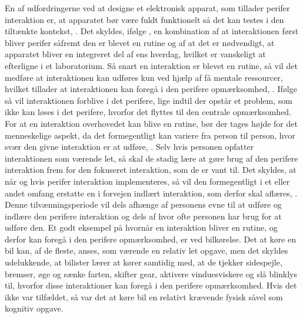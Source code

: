 En af udfordringerne ved at designe et elektronisk apparat, som tillader perifer interaktion er, at apparatet bør være fuldt funktionelt så det kan testes i den tiltænkte kontekst, \parencite[s. 21]{PDF:EvaluatingPI}. Det skyldes, ifølge \textcite[s. 22]{PDF:EvaluatingPI}, en kombination af at interaktionen først bliver perifer såfremt den er blevet en rutine og af at det er nødvendigt, at apparatet bliver en integreret del af ens hverdag, hvilket er vanskeligt at efterligne i et laboratorium. Så snart en interaktion er blevet en rutine, så vil det medføre at interaktionen kan udføres kun ved hjælp af få mentale ressourcer, hvilket tillader at interaktionen kan foregå i den perifere opmærksomhed, \parencite[s. 2]{PDF:FacilitatingPIDesignAndEvaluation}. Ifølge \textcite[s. 14]{PDF:PIUnseenKap2} så vil interaktionen forblive i det perifere, lige indtil der opstår et problem, som ikke kan løses i det perifere, hvorfor det flyttes til den centrale opmærksomhed. For at en interaktion overhovedet kan blive en rutine, bør der tages højde for det menneskelige aspekt, da det formegentligt kan variere fra person til person, hvor svær den givne interaktion er at udføre, \parencite[s. 248]{PDF:PICharacteristicsAndConsiderations}. Selv hvis personen opfatter interaktionen som værende let, så skal de stadig lære at gøre brug af den perifere interaktion frem for den fokuseret interaktion, som de er vant til. Det skyldes, at når og hvis perifer interaktion implementeres, så vil den formegentligt i et eller andet omfang erstatte en i forvejen indlært interaktion, som derfor skal aflæres, \parencite[s. 248]{PDF:PICharacteristicsAndConsiderations}. Denne tilvænningsperiode vil dels afhænge af personens evne til at udføre og indlære den perifere interaktion og dels af hvor ofte personen har brug for at udføre den. Et godt eksempel på hvornår en interaktion bliver en rutine, og derfor kan foregå i den perifere opmærksomhed, er ved bilkørelse. Det at køre en bil kan, af de fleste, anses, som værende en relativ let opgave, men det skyldes udelukkende, at bilister lærer at kører samtidig med, at de tjekker sidespejle, bremser, øge og sænke farten, skifter gear, aktivere vinduesviskere og slå blinklys til, hvorfor disse interaktioner kan foregå i den perifere opmærksomhed. Hvis det ikke var tilfældet, så var det at køre bil en relativt krævende fysisk såvel som kognitiv opgave. \blankline 
%
